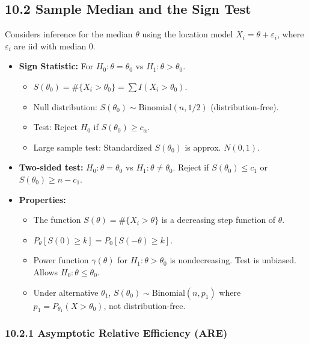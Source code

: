 \subsection{10.2 Sample Median and the Sign Test}

Considers inference for the median $\theta$ using the location model $X_i = \theta + \varepsilon_i$, where $\varepsilon_i$ are iid with median 0.

\begin{itemize}
	\item \textbf{Sign Statistic:} For $H_0: \theta = \theta_0$ vs $H_1: \theta > \theta_0$.
	\begin{itemize}
		\item $S(\theta_0) = \#\{X_i > \theta_0\} = \sum I(X_i > \theta_0)$.
		\item Null distribution: $S(\theta_0) \sim \text{Binomial}(n, 1/2)$ (distribution-free).
		\item Test: Reject $H_0$ if $S(\theta_0) \ge c_\alpha$.
		\item Large sample test: Standardized $S(\theta_0)$ is approx. $N(0,1)$.
	\end{itemize}
	\item \textbf{Two-sided test:} $H_0: \theta = \theta_0$ vs $H_1: \theta \neq \theta_0$. Reject if $S(\theta_0) \le c_1$ or $S(\theta_0) \ge n-c_1$.
	\item \textbf{Properties:}
	\begin{itemize}
		\item The function $S(\theta) = \#\{X_i > \theta\}$ is a decreasing step function of $\theta$.
		\item $P_{\theta}[S(0) \geq k] = P_{0}[S(-\theta) \geq k]$.
		\item Power function $\gamma(\theta)$ for $H_1: \theta > \theta_0$ is nondecreasing. Test is unbiased. Allows $H_0: \theta \leq \theta_0$.
		\item Under alternative $\theta_1$, $S(\theta_0) \sim \text{Binomial}(n, p_1)$ where $p_1 = P_{\theta_1}(X>\theta_0)$, not distribution-free.
	\end{itemize}
\end{itemize}

\subsubsection{10.2.1 Asymptotic Relative Efficiency (ARE)}

